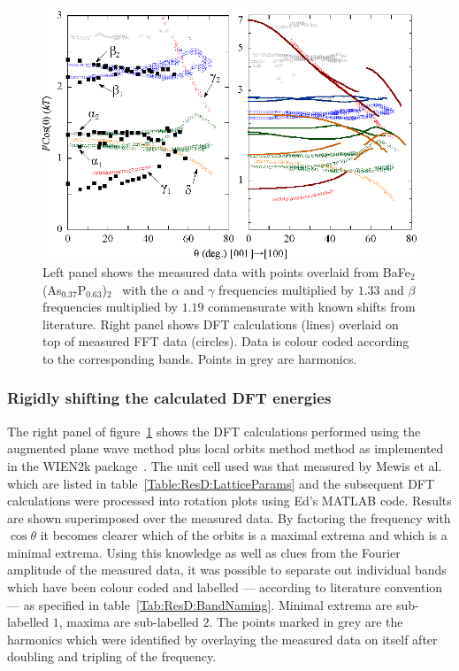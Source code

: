 \begin{figure}[htbp]
    \begin{center}
        \includegraphics[scale=1.0]{Chapter-dHvABaFe2P2/Figures/AngleDepMeasurements/IdentifyingBands/IdentifyingBands}
        \caption{Left panel shows the measured data with points overlaid from BaFe$_2$(As$_{0.37}$P$_{0.63}$)$_2$~\cite{Analytis2010c} with the $\alpha$ and $\gamma$ frequencies multiplied by $1.33$ and $\beta$ frequencies multiplied by $1.19$ commensurate with known shifts from literature. Right panel shows \ac{DFT} calculations (lines) overlaid on top of measured \ac{FFT} data (circles). Data is colour coded according to the corresponding bands. Points in grey are harmonics.}
        \label{Fig:ResD:IdentifyingBands}
    \end{center}
\end{figure}



\subsubsection{Rigidly shifting the calculated \ac{DFT} energies}
    \label{Sec:ResD:DFTShifts}

The right panel of figure~\ref{Fig:ResD:IdentifyingBands} shows the \ac{DFT} calculations performed using the augmented plane wave method plus local orbits method method as implemented in the WIEN2k package~\cite{Blaha2001}. The unit cell used was that measured by Mewis et al. which are listed in table~\ref{Table:ResD:LatticeParams} and the subsequent \ac{DFT} calculations were processed into rotation plots using Ed's MATLAB code. Results are shown superimposed over the measured data. By factoring the frequency with $\cos{\theta}$ it becomes clearer which of the orbits is a maximal extrema and which is a minimal extrema. Using this knowledge as well as clues from the Fourier amplitude of the measured data, it was possible to separate out individual bands which have been colour coded and labelled --- according to literature convention --- as specified in table~\ref{Tab:ResD:BandNaming}. Minimal extrema are sub-labelled $1$, maxima are sub-labelled $2$. The points marked in grey are the harmonics which were identified by overlaying the measured data on itself after doubling and tripling of the frequency.

